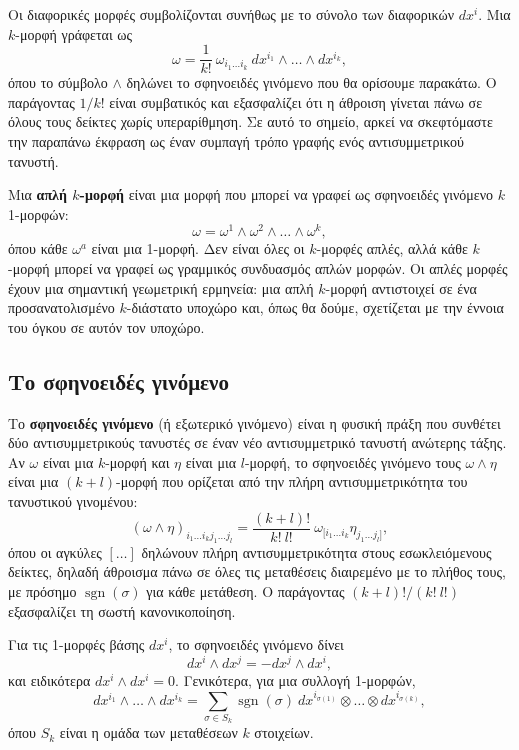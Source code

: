 \documentclass[12pt]{article}
\begin{document}
Οι διαφορικές μορφές συμβολίζονται συνήθως με το σύνολο των διαφορικών \( dx^i \). Μια \( k \)-μορφή γράφεται ως
\[
\omega = \frac{1}{k!} \ \omega_{i_1 \dots i_k} \ dx^{i_1} \wedge \dots \wedge dx^{i_k},
\]
όπου το σύμβολο \( \wedge \) δηλώνει το σφηνοειδές γινόμενο που θα ορίσουμε παρακάτω. Ο παράγοντας \( 1/k! \) είναι συμβατικός και εξασφαλίζει ότι η άθροιση γίνεται πάνω σε όλους τους δείκτες χωρίς υπεραρίθμηση. Σε αυτό το σημείο, αρκεί να σκεφτόμαστε την παραπάνω έκφραση ως έναν συμπαγή τρόπο γραφής ενός αντισυμμετρικού τανυστή.

Μια \textbf{απλή \( k \)-μορφή} είναι μια μορφή που μπορεί να γραφεί ως σφηνοειδές γινόμενο \( k \) 1-μορφών:
\[
\omega = \omega^1 \wedge \omega^2 \wedge \dots \wedge \omega^k,
\]
όπου κάθε \( \omega^a \) είναι μια 1-μορφή. Δεν είναι όλες οι \( k \)-μορφές απλές, αλλά κάθε \( k \)-μορφή μπορεί να γραφεί ως γραμμικός συνδυασμός απλών μορφών. Οι απλές μορφές έχουν μια σημαντική γεωμετρική ερμηνεία: μια απλή \( k \)-μορφή αντιστοιχεί σε ένα προσανατολισμένο \( k \)-διάστατο υποχώρο και, όπως θα δούμε, σχετίζεται με την έννοια του όγκου σε αυτόν τον υποχώρο.

\subsection{Το σφηνοειδές γινόμενο}

Το \textbf{σφηνοειδές γινόμενο} (ή εξωτερικό γινόμενο) είναι η φυσική πράξη που συνθέτει δύο αντισυμμετρικούς τανυστές σε έναν νέο αντισυμμετρικό τανυστή ανώτερης τάξης. Αν \( \omega \) είναι μια \( k \)-μορφή και \( \eta \) είναι μια \( l \)-μορφή, το σφηνοειδές γινόμενο τους \( \omega \wedge \eta \) είναι μια \( (k+l) \)-μορφή που ορίζεται από την πλήρη αντισυμμετρικότητα του τανυστικού γινομένου:
\[
(\omega \wedge \eta)_{i_1 \dots i_k j_1 \dots j_l} = \frac{(k+l)!}{k! \ l!} \ \omega_{[i_1 \dots i_k} \eta_{j_1 \dots j_l]}, \tag{39}
\]
όπου οι αγκύλες \( [\dots] \) δηλώνουν πλήρη αντισυμμετρικότητα στους εσωκλειόμενους δείκτες, δηλαδή άθροισμα πάνω σε όλες τις μεταθέσεις διαιρεμένο με το πλήθος τους, με πρόσημο \( \operatorname{sgn}(\sigma) \) για κάθε μετάθεση. Ο παράγοντας \( (k+l)!/(k! \ l!) \) εξασφαλίζει τη σωστή κανονικοποίηση.

Για τις 1-μορφές βάσης \( dx^i \), το σφηνοειδές γινόμενο δίνει
\[
dx^i \wedge dx^j = - dx^j \wedge dx^i, \tag{40}
\]
και ειδικότερα \( dx^i \wedge dx^i = 0 \). Γενικότερα, για μια συλλογή 1-μορφών,
\[
dx^{i_1} \wedge \dots \wedge dx^{i_k} = \sum_{\sigma \in S_k} \operatorname{sgn}(\sigma) \ dx^{i_{\sigma(1)}} \otimes \dots \otimes dx^{i_{\sigma(k)}}, \tag{41}
\]
όπου \( S_k \) είναι η ομάδα των μεταθέσεων \( k \) στοιχείων.
\end{document}
